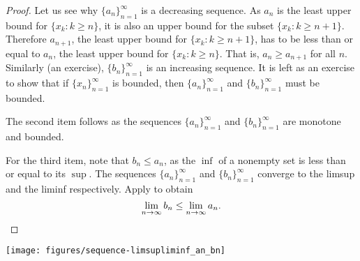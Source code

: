 \begin{proof}
Let us see why $\{ a_n \}_{n=1}^\infty$ is a decreasing sequence.  As $a_n$ is the least upper
bound for $\{ x_k : k \geq n \}$, it is also
an upper bound for the subset $\{ x_k : k \geq n+1 \}$.  Therefore
$a_{n+1}$, the least upper bound for
$\{ x_k : k \geq n+1 \}$, has to be less than or equal to $a_n$,
the least upper bound for
$\{ x_k : k \geq n \}$.
That is,
$a_n \geq a_{n+1}$ for all $n$.  Similarly (an exercise),
$\{ b_n \}_{n=1}^\infty$ is an increasing sequence.
It is left as an exercise to show that
if $\{ x_n \}_{n=1}^\infty$ is bounded, then $\{ a_n \}_{n=1}^\infty$ and
$\{ b_n \}_{n=1}^\infty$ must be bounded.

The second item follows as the sequences
$\{ a_n \}_{n=1}^\infty$ and $\{ b_n \}_{n=1}^\infty$ are monotone and bounded.

For the third item, note that $b_n \leq a_n$, as the $\inf$ of a nonempty set
is less than or equal to its $\sup$.  The sequences $\{ a_n \}_{n=1}^\infty$
and $\{ b_n \}_{n=1}^\infty$
converge to the limsup and the liminf respectively.
Apply  to obtain
\begin{equation*}
\lim_{n\to \infty} b_n \leq \lim_{n\to \infty} a_n.  \qedhere
\end{equation*}
\end{proof}
\begin{myfigureht}
\texttt{[image: figures/sequence-limsupliminf\_an\_bn]}
\caption{First 50 terms of an example sequence.  Terms $x_n$ of the sequence are
marked with dots
(\raisebox{0.25ex}{\tiny$\bullet$}),
$a_n$ are marked with
circles ($\circ$), and
$b_n$ are marked with diamonds ($\diamond$).\label{sequence-limsupliminf_an_bn}}
\end{myfigureht}

